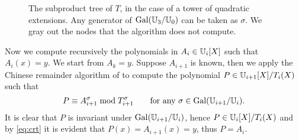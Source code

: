 \begin{figure}[tb]
  \centering
  
  \hfill
  
  \caption{The subproduct tree of $T$, in the case of a tower of
    quadratic extensions. Any generator of $\operatorname{Gal}(\mathbb{U}_3/\mathbb{U}_0)$ can be
    taken as $\sigma$. We gray out the nodes that the algorithm does
    not compute.}
  \label{fig:tree}
\end{figure}



Now we compute recursively the polynomials in $A_i\in\mathbb{U}_i[X]$ such
that $A_i(x)=y$. We start from $A_k=y$. Suppose $A_{i+1}$ is known,
then we apply the Chinese remainder algorithm of \cite[$\S$10.3]{vzGG}
to compute the polynomial $P\in\mathbb{U}_{i+1}[X]/T_i(X)$ such that
\begin{equation}
  \label{eq:crt}
  P \equiv A_{i+1}^\sigma \bmod T_{i+1}^\sigma
  \qquad\text{for any $\sigma\in\operatorname{Gal}(\mathbb{U}_{i+1}/\mathbb{U}_i)$.}
\end{equation}
It is clear that $P$ is invariant under $\operatorname{Gal}(\mathbb{U}_{i+1}/\mathbb{U}_i)$, hence
$P\in\mathbb{U}_i[X]/T_i(X)$ and by \eqref{eq:crt} it is evident that
$P(x)=A_{i+1}(x)=y$, thus $P=A_i$.

